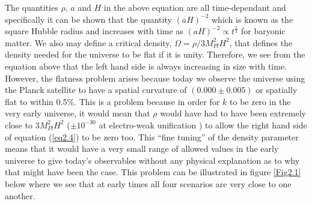\documentclass[a4paper,12pt,twoside]{report}
\begin{document}
The quantities $\rho$, $a$ and $H$ in the above equation are all time-dependant and specifically it can be shown \cite{liddle2013introduction} that the quantity $(aH)^{-2}$ which is known as the square Hubble radius and increases with time as $(aH)^{-2} \propto t^{\frac{2}{3}}$ for baryonic matter. We also may define a critical density, $\Omega = \rho/3M_{Pl}^{2}H^{2}$, that defines the density needed for the universe to be flat if it is unity. Therefore, we see from the equation above that the left hand side is always increasing in size with time. However, the flatness problem arises because today we observe the universe using the Planck satellite \cite{Planck} to have a spatial curvature of $(0.000 \pm 0.005)$ or spatially flat to within 0.5\%. This is a problem because in order for $k$ to be zero in the very early universe, it would mean that $\rho$ would have had to have been extremely close to $3M_{Pl}^{2}H^{2}$ ($\pm10^{-30}$ at electro-weak unification \cite{liddle2013introduction}) to allow the right hand side of equation (\ref{eq2.4}) to be zero too. This ``fine tuning'' of the density parameter means that it would have a very small range of allowed values in the early universe to give today's observables without any physical explanation as to why that might have been the case. This problem can be illustrated in figure \ref{Fig2.1} below where we see that at early times all four scenarios are very close to one another.
\end{document}
